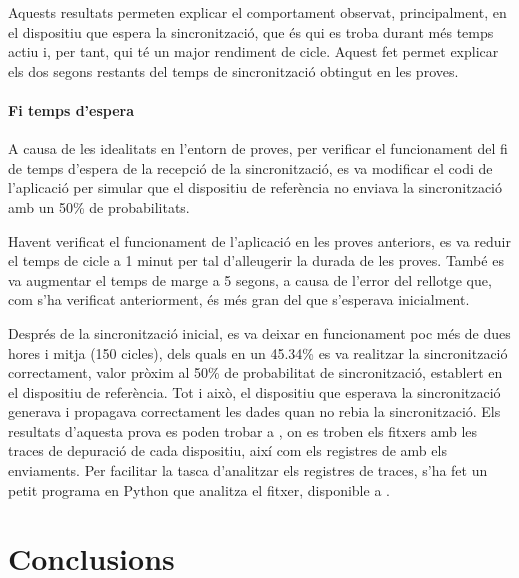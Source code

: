 \documentclass{tfgitic}[2024/07/01]
\begin{document}
{Aquests resultats permeten explicar el comportament observat, principalment, en el dispositiu que espera la sincronització, que és qui es troba durant més temps actiu i, per tant, qui té un major rendiment de cicle. Aquest fet permet explicar els dos segons restants del temps de sincronització obtingut en les proves.

\subsubsection{Fi temps d'espera}
A causa de les idealitats en l'entorn de proves, per verificar el funcionament del fi de temps d'espera de la recepció de la sincronització, es va modificar el codi de l'aplicació per simular que el dispositiu de referència no enviava la sincronització amb un 50\% de probabilitats. 

Havent verificat el funcionament de l'aplicació en les proves anteriors, es va reduir el temps de cicle a 1 minut per tal d'alleugerir la durada de les proves. També es va augmentar el temps de marge a 5 segons, a causa de l'error del rellotge que, com s'ha verificat anteriorment, és més gran del que s'esperava inicialment.

Després de la sincronització inicial, es va deixar en funcionament poc més de dues hores i mitja (150 cicles), dels quals en un 45.34\% es va realitzar la sincronització correctament, valor pròxim al 50\% de probabilitat de sincronització, establert en el dispositiu de referència. Tot i això, el dispositiu que esperava la sincronització generava i propagava correctament les dades quan no rebia la sincronització. Els resultats d'aquesta prova es poden trobar a , on es troben els fitxers amb les traces de depuració de cada dispositiu, així com els registres de  amb els enviaments. Per facilitar la tasca d'analitzar els registres de traces, s'ha fet un petit programa en Python que analitza el fitxer, disponible a .

\chapter{Conclusions}

}
\end{document}
